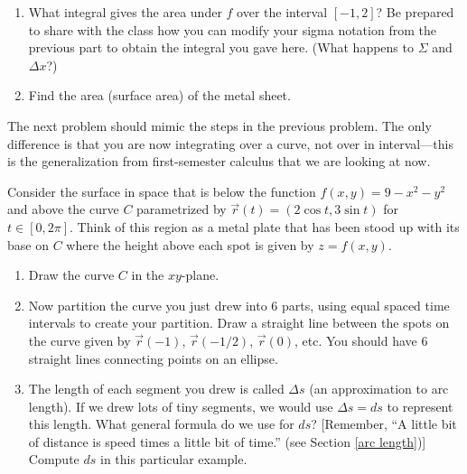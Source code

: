 \begin{problem}
\begin{enumerate}
\item What integral gives the area under $f$ over the interval $[-1,2]$? Be prepared to share with the class how you can modify your sigma notation from the previous part to obtain the integral you gave here. (What happens to $\Sigma$ and $\Delta x$?)
\item Find the area (surface area) of the metal sheet.
\end{enumerate}

\end{problem}

The next problem should mimic the steps in the previous problem.  The only difference is that you are now integrating over a curve, not over in interval---this is the generalization from first-semester calculus that we are looking at now.

\begin{problem}%
%
%
 Consider the surface in space that is below the function 
$f(x,y)=9-x^2-y^2$ and above the curve $C$ parametrized by 
$\vec r(t)=(2\cos t, 3\sin t)$ for $t\in[0,2\pi]$.  Think of this region as a metal plate that has been stood up with its base on $C$ where the height above each spot is given by $z=f(x,y)$.
\begin{enumerate}
 \item Draw the curve $C$ in the $xy$-plane. 
 \item Now partition the curve you just drew into 6 parts, using equal spaced time intervals to create your partition. Draw a straight line between the spots on the curve given by $\vec r(-1)$, $\vec r(-1/2)$, $\vec r(0)$, etc.  You should have 6 straight lines connecting points on an ellipse.
 \item The length of each segment you drew is called $\Delta s$ (an approximation to arc length). If we drew lots of tiny segments, we would use $\Delta s=ds$ to represent this length.  What general formula do we use for $ds$? [Remember, ``A little bit of distance is speed times a little bit of time.'' (see Section \ref{arc length})] Compute $ds$ in this particular example.

\end{enumerate}
\end{problem}
